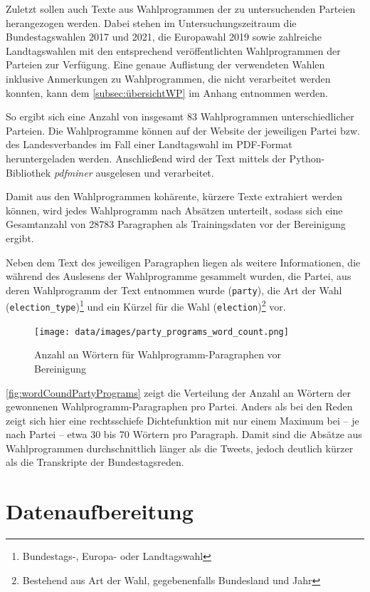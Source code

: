 Zuletzt sollen auch Texte aus Wahlprogrammen der zu untersuchenden Parteien herangezogen werden. Dabei stehen im Untersuchungszeitraum die Bundestagswahlen \num{2017} und \num{2021}, die Europawahl 2019 sowie zahlreiche Landtagswahlen mit den entsprechend veröffentlichten Wahlprogrammen der Parteien zur Verfügung. Eine genaue Auflistung der verwendeten Wahlen inklusive Anmerkungen zu Wahlprogrammen, die nicht verarbeitet werden konnten, kann dem \autoref{subsec:übersichtWP} im Anhang entnommen werden.

So ergibt sich eine Anzahl von insgesamt \num{83} Wahlprogrammen unterschiedlicher Parteien. Die Wahlprogramme können auf der Website der jeweiligen Partei bzw. des Landesverbandes im Fall einer Landtagswahl im \ac{PDF}-Format heruntergeladen werden. Anschließend wird der Text mittels der Python-Bibliothek \textit{pdfminer} ausgelesen und verarbeitet.

Damit aus den Wahlprogrammen kohärente, kürzere Texte extrahiert werden können, wird jedes Wahlprogramm nach Absätzen unterteilt, sodass sich eine Gesamtanzahl von \num{28783} Paragraphen als Trainingsdaten vor der Bereinigung ergibt.

Neben dem Text des jeweiligen Paragraphen liegen als weitere Informationen, die während des Auslesens der Wahlprogramme gesammelt wurden, die Partei, aus deren Wahlprogramm der Text entnommen wurde (\texttt{party}), die Art der Wahl (\texttt{election\_type})\footnote{Bundestags-, Europa- oder Landtagswahl} und ein Kürzel für die Wahl (\texttt{election})\footnote{Bestehend aus Art der Wahl, gegebenenfalls Bundesland und Jahr} vor.

\begin{figure}[H]
    \centering
    \texttt{[image: data/images/party\_programs\_word\_count.png]}
    \caption{Anzahl an Wörtern für Wahlprogramm-Paragraphen vor Bereinigung} \label{fig:wordCoundPartyPrograms}
\end{figure}

\autoref{fig:wordCoundPartyPrograms} zeigt die Verteilung der Anzahl an Wörtern der gewonnenen Wahlprogramm-Paragraphen pro Partei. Anders als bei den Reden zeigt sich hier eine rechtsschiefe Dichtefunktion mit nur einem Maximum bei -- je nach Partei -- etwa \num{30} bis \num{70} Wörtern pro Paragraph. Damit sind die Absätze aus Wahlprogrammen durchschnittlich länger als die Tweets, jedoch deutlich kürzer als die Transkripte der Bundestagsreden. 


\section{Datenaufbereitung} \label{sec:dataPreparation}

